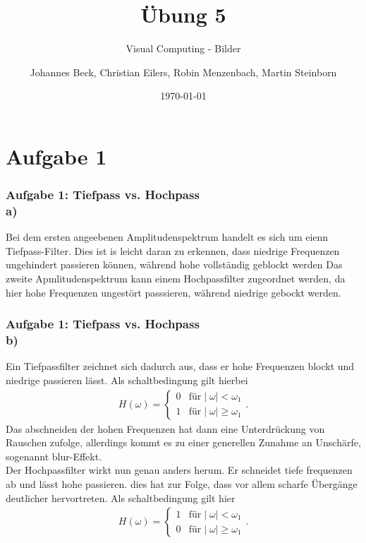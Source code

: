 \documentclass[accentcolor=tud9c,colorbacktitle,inverttitle,landscape,german,presentation,t]{tudbeamer}
\begin{document}
\title{\"Ubung 5}
\subtitle{Visual Computing - Bilder}

\author[Johannes Beck, Christian Eilers, Robin Menzenbach, Martin Steinborn]{Johannes Beck, Christian Eilers, Robin Menzenbach, Martin Steinborn}


\date{\today}

\begin{titleframe}
\end{titleframe}

\section{Aufgabe 1}
	\begin{frame}
		\frametitle{Aufgabe 1: Tiefpass vs. Hochpass \\ a)}
		Bei dem ersten angeebenen Amplitudenspektrum handelt es sich um eienn Tiefpass-Filter. Dies ist is leicht daran zu erkennen, dass niedrige Frequenzen ungehindert passieren k\"onnen, w\"ahrend hohe vollst\"andig geblockt werden
		Das zweite Apmlitudenspektrum kann einem Hochpassfilter zugeordnet werden, da hier hohe Frequenzen ungest\"ort passsieren, w\"ahrend niedrige gebockt werden.
	\end{frame}
	
	\begin{frame}
	\frametitle{Aufgabe 1: Tiefpass vs. Hochpass \\ b)} %
	Ein Tiefpassfilter zeichnet sich dadurch aus, dass er hohe Frequenzen blockt und niedrige passieren l\"asst. Als schaltbedingung gilt hierbei
	\begin{align*}
	H(\omega) = \left\{\begin{array}{rl}0 & \textrm{f\"ur} \mid\omega\mid < \omega_1 \\ 1 & \textrm{f\"ur} \mid\omega\mid \geq \omega_1	\end{array}\right. .
\end{align*}
	Das abschneiden der hohen Frequenzen hat dann eine Unterdr\"uckung von Rauschen zufolge, allerdings kommt es zu einer generellen Zunahme an Unsch\"arfe, sogenannt blur-Effekt.	\\	
	
	Der Hochpassfilter wirkt nun genau anders herum. Er schneidet tiefe frequenzen ab und l\"asst hohe passieren. dies hat zur Folge, dass vor allem scharfe \"Uberg\"ange deutlicher hervortreten. Als schaltbedingung gilt hier
	\begin{align*}
	H(\omega) = \left\{\begin{array}{rl}1 & \textrm{f\"ur} \mid\omega\mid < \omega_1 \\ 0 & \textrm{f\"ur} \mid\omega\mid \geq \omega_1	\end{array}\right. .
\end{align*}	
	\end{frame}
\end{document}
